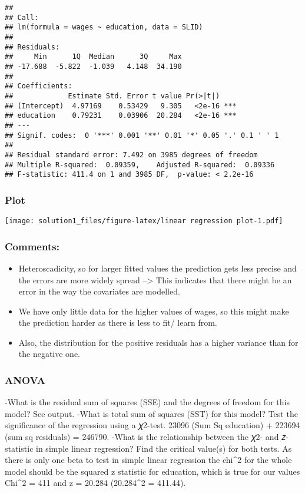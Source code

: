 \documentclass[
]{article}
\providecommand{\tightlist}{%
  \setlength{\itemsep}{0pt}\setlength{\parskip}{0pt}}
\begin{document}
\begin{verbatim}
## 
## Call:
## lm(formula = wages ~ education, data = SLID)
## 
## Residuals:
##     Min      1Q  Median      3Q     Max 
## -17.688  -5.822  -1.039   4.148  34.190 
## 
## Coefficients:
##             Estimate Std. Error t value Pr(>|t|)    
## (Intercept)  4.97169    0.53429   9.305   <2e-16 ***
## education    0.79231    0.03906  20.284   <2e-16 ***
## ---
## Signif. codes:  0 '***' 0.001 '**' 0.01 '*' 0.05 '.' 0.1 ' ' 1
## 
## Residual standard error: 7.492 on 3985 degrees of freedom
## Multiple R-squared:  0.09359,    Adjusted R-squared:  0.09336 
## F-statistic: 411.4 on 1 and 3985 DF,  p-value: < 2.2e-16
\end{verbatim}

\hypertarget{plot}{%
\subsubsection{Plot}\label{plot}}

\texttt{[image: solution1\_files/figure-latex/linear regression plot-1.pdf]}

\hypertarget{comments}{%
\subsubsection{Comments:}\label{comments}}

\begin{itemize}
\tightlist
\item
  Heteroscadicity, so for larger fitted values the prediction gets less
  precise and the errors are more widely spread --\textgreater{} This
  indicates that there might be an error in the way the covariates are
  modelled.
\item
  We have only little data for the higher values of wages, so this might
  make the prediction harder as there is less to fit/ learn from.
\item
  Also, the distribution for the positive residuals has a higher
  variance than for the negative one.
\end{itemize}

\hypertarget{anova}{%
\subsubsection{ANOVA}\label{anova}}

-What is the residual sum of squares (SSE) and the degrees of freedom
for this model? See output. -What is total sum of squares (SST) for this
model? Test the significance of the regression using a 𝜒2-test. 23096
(Sum Sq education) + 223694 (sum sq residuals) = 246790. -What is the
relationship between the 𝜒2- and 𝑧-statistic in simple linear
regression? Find the critical value(s) for both tests. As there is only
one beta to test in simple linear regression the chi\^{}2 for the whole
model should be the squared z statistic for education, which is true for
our values Chi\^{}2 = 411 and z = 20.284 (20.284\^{}2 = 411.44).
\end{document}
